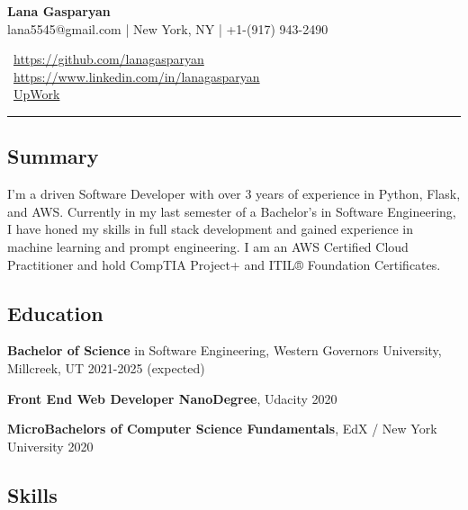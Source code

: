 \documentclass[11pt,letterpaper]{article}
\newcommand{\normalsizesection}{\normalsize}
\newcommand{\smallersection}{\small}
\newcommand{\sectionbox}[1]{%
    \vspace{0.2em}
    \begin{tcolorbox}[
        colback=sectionbg,
        colframe=sectionbg,
        width=\textwidth,
        left=5pt,
        right=5pt,
        top=2pt,
        bottom=2pt,
        boxrule=0pt,
        arc=0pt,
        boxsep=0pt,
    ]
    \section*{#1}
    \end{tcolorbox}
    \vspace{-0.3em}
}
\newcommand{\iconlink}[3]{%
    #1~\href{#2}{#3}%
}
\begin{document}
\begin{minipage}[t]{0.6\textwidth}
    \vspace{0pt}
    \fontsize{24pt}{28pt}\selectfont\textbf{\color{namecolor}Lana Gasparyan}\\[8pt]
    \footnotesize lana5545@gmail.com | New York, NY | +1-(917) 943-2490
\end{minipage}%
\begin{minipage}[t]{0.4\textwidth}
    \vspace{0pt}
    \raggedright
    \footnotesize\iconlink{\faGithub}{https://github.com/lanagasparyan}{https://github.com/lanagasparyan}\\
    \footnotesize\iconlink{\faLinkedin}{https://www.linkedin.com/in/lanagasparyan}{https://www.linkedin.com/in/lanagasparyan}\\
    \footnotesize\iconlink{\faBriefcase}{https://www.upwork.com/freelancers/~lanagasparyan}{UpWork}
\end{minipage}

\vspace{0mm}
\noindent\rule{\textwidth}{0.4pt}
\vspace{-2mm}

\sectionbox{Summary}
\smallersection

\noindent I'm a driven Software Developer with over 3 years of experience in Python, Flask, and AWS. Currently in my last semester of a Bachelor's in Software Engineering, I have honed my skills in full stack development and gained experience in machine learning and prompt engineering. I am an AWS Certified Cloud Practitioner and hold CompTIA Project+ and ITIL® Foundation Certificates.

\normalsizesection

\sectionbox{Education}
\smallersection

\noindent\textbf{Bachelor of Science} in Software Engineering, Western Governors University, Millcreek, UT \hfill 2021-2025 (expected)

\vspace{-1pt}
\noindent\textbf{Front End Web Developer NanoDegree}, Udacity \hfill 2020

\vspace{-1pt}
\noindent\textbf{MicroBachelors of Computer Science Fundamentals}, EdX / New York University \hfill 2020

\normalsizesection

\sectionbox{Skills}
\smallersection
\end{document}

